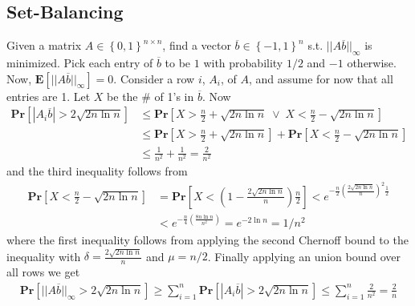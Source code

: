 \documentclass[12pt]{article}
\begin{document}
\subsection{Set-Balancing}
Given a matrix $A \in \left\{ 0,1 \right\}^{n \times n}$, find a vector $\overline{b} \in \left\{ -1, 1 \right\}^n$ s.t. $|| A\overline{b} ||_{\infty}$ is minimized. Pick each entry of $\overline{b}$ to be $1$ with probability $1/2$ and $-1$ otherwise. Now, $\mathbf{E} \left[ || A\overline{b} ||_{\infty} \right] = 0$. Consider a row $i$, $A_{i}$, of $A$, and assume for now that all entries are 1. Let $X$ be the \# of 1's in $\overline{b}$. Now
\begin{align*}
\mathbf{Pr} \left[ | A_i\overline{b} | > 2\sqrt{2n \ln n} \right] &\leq \mathbf{Pr} \left[ X > \frac{n}{2} + \sqrt{2n \ln n} \; \lor \; X < \frac{n}{2} - \sqrt{2n \ln n} \right] \\
&\leq \mathbf{Pr} \left[ X > \frac{n}{2} + \sqrt{2n \ln n} \right] + \mathbf{Pr} \left[ X < \frac{n}{2} - \sqrt{2n \ln n} \right] \\
&\leq \frac{1}{n^2} + \frac{1}{n^2} = \frac{2}{n^2}
\end{align*}
and the third inequality follows from
\begin{align*}
\mathbf{Pr} \left[ X < \frac{n}{2} - \sqrt{2n \ln n} \right]
&= \mathbf{Pr} \left[ X < \left( 1 - \frac{2\sqrt{2n \ln n}}{n} \right)\frac{n}{2} \right]
< e^{-\frac{n}{2} \left( \frac{2\sqrt{2n \ln n}}{n}\right)^2\frac{1}{2}} \\
&< e^{-\frac{n}{4} \left( \frac{8n \ln n}{n^2}\right)} = e^{-2\ln n} = 1/n^2
\end{align*}
where the first inequality follows from applying the second Chernoff bound to the inequality with $\delta=\frac{2\sqrt{2n \ln n}}{n}$ and $\mu=n/2$. Finally applying an union bound over all rows we get
\begin{align*}
\mathbf{Pr} \left[ || A\overline{b} ||_{\infty} > 2\sqrt{2n \ln n} \right] \geq \sum_{i=1}^n \mathbf{Pr} \left[ | A_i\overline{b} | > 2\sqrt{2n \ln n} \right] \leq \sum_{i=1}^n \frac{2}{n^2} = \frac{2}{n}
\end{align*}
\end{document}
